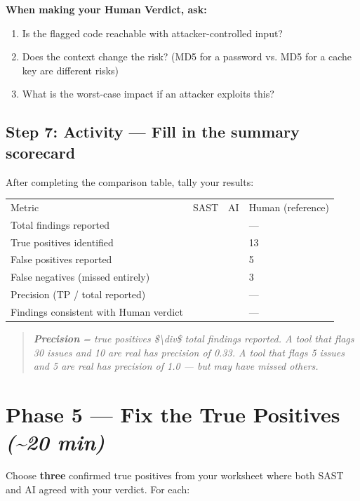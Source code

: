 \documentclass[11pt,a4paper]{book}
\begin{document}
\textbf{When making your Human Verdict, ask:}

\begin{enumerate}
  \item Is the flagged code reachable with attacker-controlled input?
  \item Does the context change the risk? (MD5 for a password vs. MD5 for a cache key are different risks)
  \item What is the worst-case impact if an attacker exploits this?
\end{enumerate}

\subsection{Step 7: Activity --- Fill in the summary scorecard}

After completing the comparison table, tally your results:

\begin{tabular}{llll}
\hline
Metric & SAST & AI & Human (reference) \\
Total findings reported &  &  & --- \\
True positives identified &  &  & 13 \\
False positives reported &  &  & 5 \\
False negatives (missed entirely) &  &  & 3 \\
Precision (TP / total reported) &  &  & --- \\
Findings consistent with Human verdict &  &  & --- \\
\hline
\end{tabular}

\begin{quote}
\textit{\textbf{Precision} = true positives \$\textbackslash{}div\$ total findings reported. A tool that flags 30 issues and 10 are real has precision of 0.33. A tool that flags 5 issues and 5 are real has precision of 1.0 --- but may have missed others.}
\end{quote}

\medskip

\section{Phase 5 --- Fix the True Positives \textit{(\textasciitilde{}20 min)}}

Choose \textbf{three} confirmed true positives from your worksheet where both SAST and AI agreed with your verdict. For each:
\end{document}
